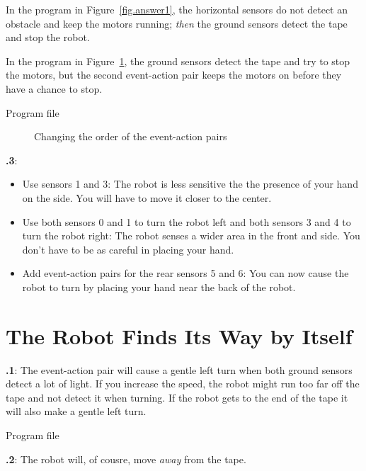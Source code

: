 \documentclass[12pt,a4paper,english]{article}
\begin{document}
In the program in Figure~\ref{fig.answer1}, the horizontal sensors
do not detect an obstacle and keep the motors running; \emph{then} the
ground sensors detect the tape and stop the robot.

In the program in Figure~\ref{fig.change}, the ground sensors
detect the tape and try to stop the motors, but the second event-action
pair keeps the motors on before they have a chance to stop.

{\raggedleft \hfill Program file }

\begin{figure}[hbt]
\begin{center}
\caption{Changing the order of the event-action pairs}\label{fig.change}
\end{center}
\end{figure}

\textbf{\thesection.3}: 
\begin{itemize}

\item Use sensors 1 and 3: The robot is less sensitive the the presence
of your hand on the side. You will have to move it closer to the center.

\item Use both sensors 0 and 1 to turn the robot left and both sensors 3
and 4 to turn the robot right: The robot senses a wider area in the
front and side. You don't have to be as careful in placing your hand.

\item Add event-action pairs for the rear sensors 5 and 6: You can now
cause the robot to turn by placing your hand near the back of the robot.

\end{itemize}


\section{The Robot Finds Its Way by Itself}


\textbf{\thesection.1}: The event-action pair 
will cause a gentle left turn when both ground sensors detect a lot of
light. If you increase the speed, the robot might run too far off the
tape and not detect it when turning. If the robot gets to the end of the
tape it will also make a gentle left turn.

{\raggedleft \hfill Program file }

\textbf{\thesection.2}: The robot will, of cousre, move \emph{away} from
the tape.
\end{document}
